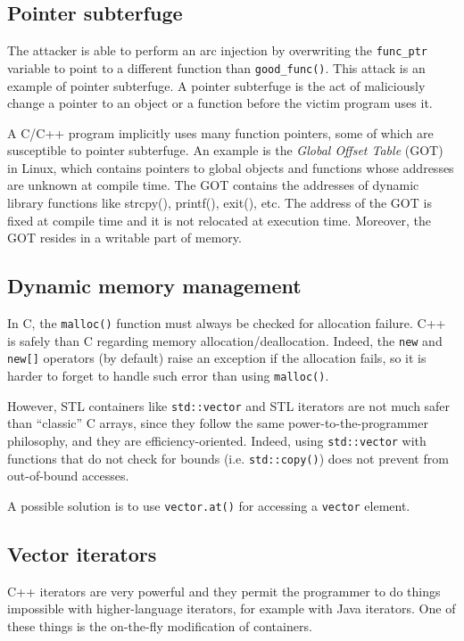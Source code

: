\documentclass[a4paper,12pt]{article}
\begin{document}
\subsection{Pointer subterfuge}
The attacker is able to perform an arc injection by overwriting the \texttt{func\_ptr} variable to point to a different function than \texttt{good\_func()}. This attack is an example of pointer subterfuge. A pointer subterfuge is the act of maliciously change a pointer to an object or a function before the victim program uses it.

A C/C++ program implicitly uses many function pointers, some of which are susceptible to pointer subterfuge. An example is the \textit{Global Offset Table} (GOT) in Linux, which contains pointers to global objects and functions whose addresses are unknown at compile time. The GOT contains the addresses of dynamic library functions like strcpy(), printf(), exit(), etc. The address of the GOT is fixed at compile time and it is not relocated at execution time. Moreover, the GOT resides in a writable part of memory.

\subsection{Dynamic memory management}
In C, the \texttt{malloc()} function must always be checked for allocation failure. C++ is safely than C regarding memory allocation/deallocation. Indeed, the \texttt{new} and \texttt{new[]} operators (by default) raise an exception if the allocation fails, so it is harder to forget to handle such error than using \texttt{malloc()}.

However, STL containers like \texttt{std::vector} and STL iterators are not much safer than “classic” C arrays, since they follow the same power-to-the-programmer philosophy, and they are efficiency-oriented. Indeed, using \texttt{std::vector} with functions that do not check for bounds (i.e. \texttt{std::copy()}) does not prevent from out-of-bound accesses.

A possible solution is to use \texttt{vector.at()} for accessing a \texttt{vector} element.

\subsection{Vector iterators}
C++ iterators are very powerful and they permit the programmer to do things impossible with higher-language iterators, for example with Java iterators. One of these things is the on-the-fly modification of containers.
\end{document}
